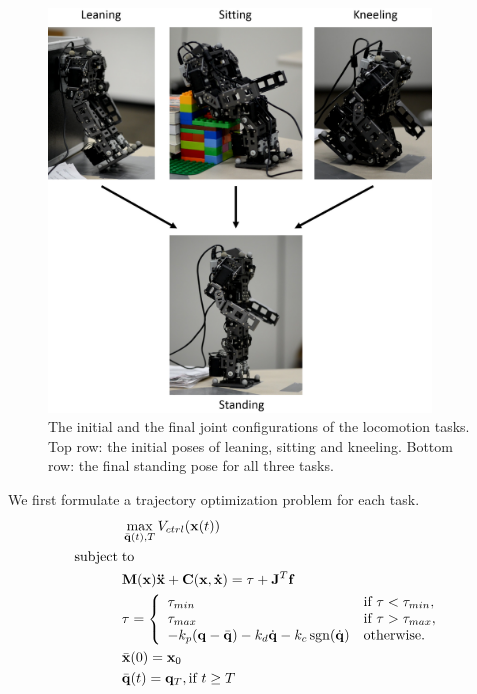 \begin{figure}[!t]
  \centering
  \includegraphics[width=4in]{figures/initialFinal}
  \caption{The initial and the final joint configurations of the locomotion tasks. Top row: the initial poses of leaning, sitting and kneeling. Bottom row: the final standing pose for all three tasks.}
  \label{fig:task}
\end{figure}


We first formulate a trajectory optimization problem for each task.
\begin{align}
 \label{eqn:obj}&\max_{\bar{\mathbf{q}}(t),T} V_{ctrl}(\mathbf{x}(t))\\
\nonumber  \mathrm{subject\;} &\mathrm{to} \\
\label{eqn:dyn1} & \mathbf{M}(\mathbf{x})\mathbf{\ddot{x}}+\mathbf{C}(\mathbf{x},\mathbf{\dot{x}}) =\tau + \mathbf{J}^T\mathbf{f}\\
\label{eqn:dyn2} &\tau =
  \left\{
    \begin{array}{ll}
      \tau_{min} & \text{if }\tau < \tau_{min},\\
      \tau_{max} & \text{if }\tau > \tau_{max},\\
      -k_p(\mathbf{q}-\bar{\mathbf{q}}) - k_d\dot{\mathbf{q}} - k_c\operatorname{sgn}(\dot{\mathbf{q}}) & \text{otherwise.}\\
    \end{array}
  \right.\\
\label{eqn:boundary1}&\bar{\mathbf{x}}(0) = \mathbf{x}_0\\
\label{eqn:boundary2}&\bar{\mathbf{q}}(t) = \mathbf{q}_T, \text{if } t \geq T
\end{align}

